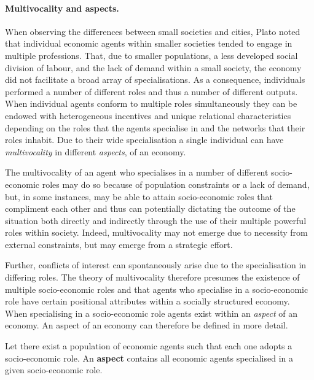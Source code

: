 \paragraph{Multivocality and aspects.}

When observing the differences between small societies and cities, Plato noted that individual economic agents within smaller societies tended to engage in multiple professions. That, due to smaller populations, a less developed social division of labour, and the lack of demand within a small society, the economy did not facilitate a broad array of specialisations. As a consequence, individuals performed a number of different roles and thus a number of different outputs. When individual agents conform to multiple roles simultaneously they can be endowed with heterogeneous incentives and unique relational characteristics depending on the roles that the agents specialise in and the networks that their roles inhabit. Due to their wide specialisation a single individual can have \emph{multivocality} in different \emph{aspects}, of an economy.

The multivocality of an agent who specialises in a number of different socio-economic roles may do so because of population constraints or a lack of demand, but, in some instances, may be able to attain socio-economic roles that compliment each other and thus can potentially dictating the outcome of the situation both directly and indirectly through the use of their multiple powerful roles within society. Indeed, multivocality may not emerge due to necessity from external constraints, but may emerge from a strategic effort. 

Further, conflicts of interest can spontaneously arise due to the specialisation in differing roles. The theory of multivocality therefore presumes the existence of multiple socio-economic roles and that agents who specialise in a socio-economic role have certain positional attributes within a socially structured economy. When specialising in a socio-economic role agents exist within an \emph{aspect} of an economy. An aspect of an economy can therefore be defined in more detail.

\begin{definition}[Aspect] \label{def:aspect}
Let there exist a population of economic agents such that each one adopts a socio-economic role. An \textbf{aspect} contains all economic agents specialised in a given socio-economic role.
\end{definition}

